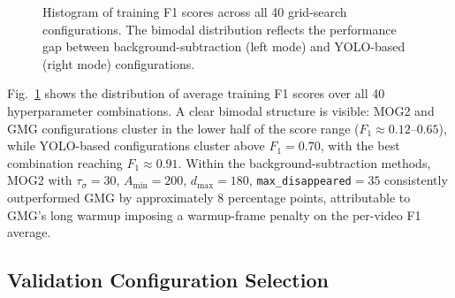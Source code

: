 \documentclass[10pt, conference, compsocconf]{IEEEtran}
\begin{document}
\begin{figure}[!t]
\centering
{}
\caption{Histogram of training F1 scores across all 40
grid-search configurations. The bimodal distribution reflects the
performance gap between background-subtraction (left mode) and
YOLO-based (right mode) configurations.}
\label{fig:f1hist}
\end{figure}

Fig.~\ref{fig:f1hist} shows the distribution of average training F1
scores over all 40 hyperparameter combinations. A clear bimodal
structure is visible: MOG2 and GMG configurations cluster in the
lower half of the score range ($F_1 \approx 0.12$--$0.65$), while
YOLO-based configurations cluster above $F_1 = 0.70$, with the best
combination reaching $F_1 \approx 0.91$. Within the
background-subtraction methods, MOG2 with
$\tau_\sigma=30$, $A_\text{min}=200$,
$d_\text{max}=180$, \texttt{max\_disappeared}$=35$
consistently outperformed GMG by approximately 8 percentage points,
attributable to GMG's long warmup imposing a warmup-frame penalty
on the per-video F1 average.

\subsection{Validation Configuration Selection}
\end{document}

